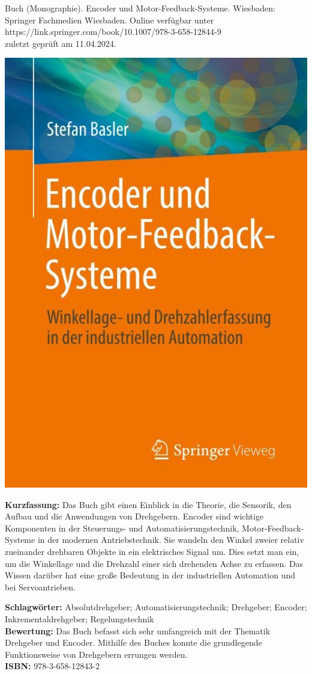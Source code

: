 {
Buch (Monographie). Encoder und Motor-Feedback-Systeme.
Wiesbaden: Springer Fachmedien Wiesbaden. Online verfügbar unter https://link.springer.com/book/10.1007/978-3-658-12844-9 \\
zuletzt geprüft am 11.04.2024.	\\
\begin{minipage}{0.38\textwidth}
	\includegraphics[width=\linewidth]{images/Basler.jpg}
\end{minipage}
\hfill
\begin{minipage}{0.6\textwidth}
\textbf{Kurzfassung:}
Das Buch gibt einen Einblick in die Theorie, die Sensorik, den Aufbau und die Anwendungen von Drehgebern. Encoder sind wichtige Komponenten in der Steuerungs- und Automatisierungstechnik, Motor-Feedback-Systeme in der modernen Antriebstechnik. Sie wandeln den Winkel zweier relativ zueinander drehbaren Objekte in ein elektrisches Signal um. Dies setzt man ein, um die Winkellage und die Drehzahl einer sich drehenden Achse zu erfassen. Das Wissen darüber hat eine große Bedeutung in der industriellen Automation und bei Servoantrieben.	
\end{minipage}
\textbf{Schlagwörter:}
Absolutdrehgeber; Automatisierungstechnik; Drehgeber; Encoder; Inkrementaldrehgeber; Regelungstechnik
\\ \textbf{Bewertung:}
Das Buch befasst sich sehr umfangreich mit der Thematik Drehgeber und Encoder. Mithilfe des Buches konnte die grundlegende Funktionsweise von Drehgebern errungen werden.
\\ \textbf{ISBN:}
978-3-658-12843-2
}

